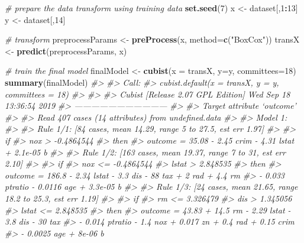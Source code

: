 \documentclass[]{book}
\newenvironment{Shaded}{\begin{snugshade}}{\end{snugshade}}
\newcommand{\CommentTok}[1]{\textcolor[rgb]{0.56,0.35,0.01}{\textit{#1}}}
\newcommand{\DataTypeTok}[1]{\textcolor[rgb]{0.13,0.29,0.53}{#1}}
\newcommand{\DecValTok}[1]{\textcolor[rgb]{0.00,0.00,0.81}{#1}}
\newcommand{\KeywordTok}[1]{\textcolor[rgb]{0.13,0.29,0.53}{\textbf{#1}}}
\newcommand{\NormalTok}[1]{#1}
\newcommand{\OperatorTok}[1]{\textcolor[rgb]{0.81,0.36,0.00}{\textbf{#1}}}
\newcommand{\StringTok}[1]{\textcolor[rgb]{0.31,0.60,0.02}{#1}}
\begin{document}
\begin{Shaded}
\begin{Highlighting}[]
\CommentTok{# prepare the data transform using training data}
\KeywordTok{set.seed}\NormalTok{(}\DecValTok{7}\NormalTok{)}
\NormalTok{x <-}\StringTok{ }\NormalTok{dataset[,}\DecValTok{1}\OperatorTok{:}\DecValTok{13}\NormalTok{]}
\NormalTok{y <-}\StringTok{ }\NormalTok{dataset[,}\DecValTok{14}\NormalTok{]}

\CommentTok{# transform}
\NormalTok{preprocessParams <-}\StringTok{ }\KeywordTok{preProcess}\NormalTok{(x, }\DataTypeTok{method=}\KeywordTok{c}\NormalTok{(}\StringTok{"BoxCox"}\NormalTok{))}
\NormalTok{transX <-}\StringTok{ }\KeywordTok{predict}\NormalTok{(preprocessParams, x)}

\CommentTok{# train the final model}
\NormalTok{finalModel <-}\StringTok{ }\KeywordTok{cubist}\NormalTok{(}\DataTypeTok{x =}\NormalTok{ transX, }\DataTypeTok{y=}\NormalTok{y, }\DataTypeTok{committees=}\DecValTok{18}\NormalTok{)}
\KeywordTok{summary}\NormalTok{(finalModel)}
\CommentTok{#> }
\CommentTok{#> Call:}
\CommentTok{#> cubist.default(x = transX, y = y, committees = 18)}
\CommentTok{#> }
\CommentTok{#> }
\CommentTok{#> Cubist [Release 2.07 GPL Edition]  Wed Sep 18 13:36:54 2019}
\CommentTok{#> ---------------------------------}
\CommentTok{#> }
\CommentTok{#>     Target attribute `outcome'}
\CommentTok{#> }
\CommentTok{#> Read 407 cases (14 attributes) from undefined.data}
\CommentTok{#> }
\CommentTok{#> Model 1:}
\CommentTok{#> }
\CommentTok{#>   Rule 1/1: [84 cases, mean 14.29, range 5 to 27.5, est err 1.97]}
\CommentTok{#> }
\CommentTok{#>     if}
\CommentTok{#>  nox > -0.4864544}
\CommentTok{#>     then}
\CommentTok{#>  outcome = 35.08 - 2.45 crim - 4.31 lstat + 2.1e-05 b}
\CommentTok{#> }
\CommentTok{#>   Rule 1/2: [163 cases, mean 19.37, range 7 to 31, est err 2.10]}
\CommentTok{#> }
\CommentTok{#>     if}
\CommentTok{#>  nox <= -0.4864544}
\CommentTok{#>  lstat > 2.848535}
\CommentTok{#>     then}
\CommentTok{#>  outcome = 186.8 - 2.34 lstat - 3.3 dis - 88 tax + 2 rad + 4.4 rm}
\CommentTok{#>            - 0.033 ptratio - 0.0116 age + 3.3e-05 b}
\CommentTok{#> }
\CommentTok{#>   Rule 1/3: [24 cases, mean 21.65, range 18.2 to 25.3, est err 1.19]}
\CommentTok{#> }
\CommentTok{#>     if}
\CommentTok{#>  rm <= 3.326479}
\CommentTok{#>  dis > 1.345056}
\CommentTok{#>  lstat <= 2.848535}
\CommentTok{#>     then}
\CommentTok{#>  outcome = 43.83 + 14.5 rm - 2.29 lstat - 3.8 dis - 30 tax}
\CommentTok{#>            - 0.014 ptratio - 1.4 nox + 0.017 zn + 0.4 rad + 0.15 crim}
\CommentTok{#>            - 0.0025 age + 8e-06 b}

\end{Highlighting}
\end{Shaded}
\end{document}
